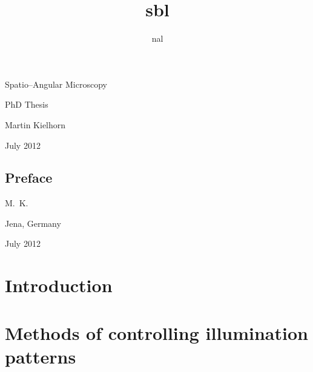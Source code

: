 \documentclass[oneside,a4paper,12pt,BCOR20mm,DIV14]{scrbook}
\title{sbl}
\author{nal}
\def\svgending{\ifx\pdfoutput\undefined%
  .eps_tex%
  \else%
  .pdf_tex%
  \fi}
\newcommand{\svginput}[2]{{\def\svgscale{#1}}}
\begin{document}
\listoftodos
\begin{titlepage}
  
  \hspace{-4cm}
  \svginput{1}{objective-trace}



  \vspace{-5cm}
  
  \hspace{4cm}\textsf{\Huge Spatio--Angular Microscopy}
  
  \vspace{2cm}
  \hspace{6cm}\textsf{\huge PhD Thesis}


  \vspace{3cm}
  \hspace{4cm}\textsf{\Large Martin Kielhorn}
  
  \vspace{1cm}
  \hspace{4cm}\textsf{\Large July 2012}
\end{titlepage}
\newpage

\section*{Preface}
\begin{flushright}
  M.~K.
\end{flushright}

\noindent
Jena, Germany

\noindent
July 2012

\newpage
\tableofcontents
\printnomenclature
\chapter{Introduction}
\chapter{Methods of controlling illumination patterns}

%

%
%
\end{document}
